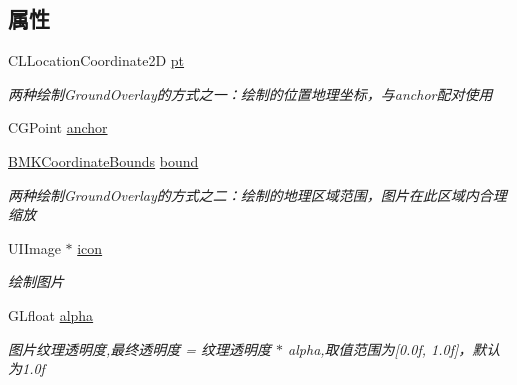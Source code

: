 \subsection*{属性}
\begin{DoxyCompactItemize}
\item 
\hypertarget{interface_b_m_k_ground_overlay_a99b7330f6eb896adf663b20cfaf0ff3d}{}C\+L\+Location\+Coordinate2\+D \hyperlink{interface_b_m_k_ground_overlay_a99b7330f6eb896adf663b20cfaf0ff3d}{pt}\label{interface_b_m_k_ground_overlay_a99b7330f6eb896adf663b20cfaf0ff3d}

\begin{DoxyCompactList}\small\item\em 两种绘制\+Ground\+Overlay的方式之一：绘制的位置地理坐标，与anchor配对使用 \end{DoxyCompactList}\item 
C\+G\+Point \hyperlink{interface_b_m_k_ground_overlay_a2601d9c702749c36f3c693cdf6165c75}{anchor}
\item 
\hypertarget{interface_b_m_k_ground_overlay_a2cc42179bfa82c4554f1f95c57013daf}{}\hyperlink{struct_b_m_k_coordinate_bounds}{B\+M\+K\+Coordinate\+Bounds} \hyperlink{interface_b_m_k_ground_overlay_a2cc42179bfa82c4554f1f95c57013daf}{bound}\label{interface_b_m_k_ground_overlay_a2cc42179bfa82c4554f1f95c57013daf}

\begin{DoxyCompactList}\small\item\em 两种绘制\+Ground\+Overlay的方式之二：绘制的地理区域范围，图片在此区域内合理缩放 \end{DoxyCompactList}\item 
\hypertarget{interface_b_m_k_ground_overlay_ac6b3c33960c8ae439c387636a27f23a0}{}U\+I\+Image $\ast$ \hyperlink{interface_b_m_k_ground_overlay_ac6b3c33960c8ae439c387636a27f23a0}{icon}\label{interface_b_m_k_ground_overlay_ac6b3c33960c8ae439c387636a27f23a0}

\begin{DoxyCompactList}\small\item\em 绘制图片 \end{DoxyCompactList}\item 
\hypertarget{interface_b_m_k_ground_overlay_ad179c59ea12b8e9db600387d0c873d47}{}G\+Lfloat \hyperlink{interface_b_m_k_ground_overlay_ad179c59ea12b8e9db600387d0c873d47}{alpha}\label{interface_b_m_k_ground_overlay_ad179c59ea12b8e9db600387d0c873d47}

\begin{DoxyCompactList}\small\item\em 图片纹理透明度,最终透明度 = 纹理透明度 $\ast$ alpha,取值范围为\mbox{[}0.\+0f, 1.\+0f\mbox{]}，默认为1.0f \end{DoxyCompactList}\end{DoxyCompactItemize}
